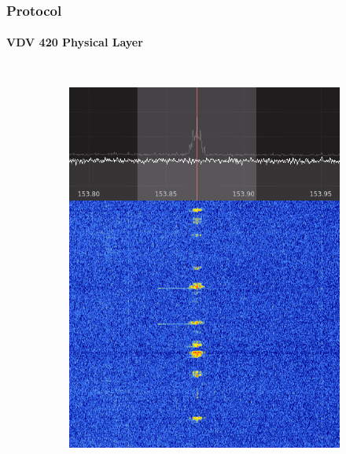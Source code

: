 \begin{frame}
\frametitle{Protocol}
\framesubtitle{VDV 420 Physical Layer}
\begin{columns}
\centering
\begin{figure}
\centering
\begin{subfigure}[b]{0.46\textwidth}
	\centering
	\includegraphics[height=0.65\textheight,width=\textwidth]{figs/spectrum_chemnitz_cropped.png}
\end{subfigure}
\hfill
\begin{subfigure}[b]{0.46\textwidth}
	\centering

\end{subfigure}
\end{figure}
\end{columns}
\end{frame}
